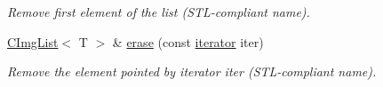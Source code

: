 \begin{DoxyCompactItemize}
\begin{DoxyCompactList}\small\item\em Remove first element of the list (STL-\/compliant name). \item\end{DoxyCompactList}\item 
\hypertarget{structcimg__library_1_1CImgList_af640222e8d8e8fc6c1292bc928e04995}{
\hyperlink{structcimg__library_1_1CImgList}{CImgList}$<$ T $>$ \& \hyperlink{structcimg__library_1_1CImgList_af640222e8d8e8fc6c1292bc928e04995}{erase} (const \hyperlink{structcimg__library_1_1CImg}{iterator} iter)}
\label{structcimg__library_1_1CImgList_af640222e8d8e8fc6c1292bc928e04995}

\begin{DoxyCompactList}\small\item\em Remove the element pointed by iterator {\ttfamily iter} (STL-\/compliant name). \item\end{DoxyCompactList}\end{DoxyCompactItemize}
